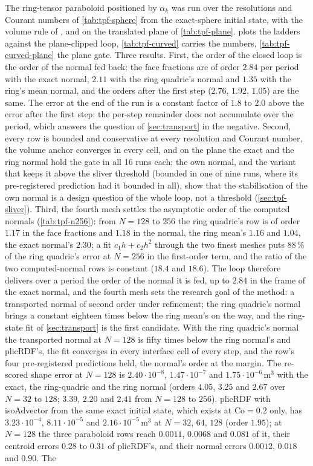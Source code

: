 \documentclass[preprint,12pt]{elsarticle}
\begin{document}
The ring-tensor paraboloid positioned by $\alpha_k$ was run over the resolutions and Courant numbers of \cref{tab:tpf-sphere} from the exact-sphere initial state, with the volume rule of \citet{KromerBothe2023Init}, and on the translated plane of \cref{tab:tpf-plane}.  plots the ladders against the plane-clipped loop, \cref{tab:tpf-curved} carries the numbers, \cref{tab:tpf-curved-plane} the plane gate. Three results. First, the order of the closed loop is the order of the normal fed back: the face fractions are of order $2.84$ per period with the exact normal, $2.11$ with the ring quadric's normal and $1.35$ with the ring's mean normal, and the orders after the first step ($2.76$, $1.92$, $1.05$) are the same. The error at the end of the run is a constant factor of $1.8$ to $2.0$ above the error after the first step: the per-step remainder does not accumulate over the period, which answers the question of \cref{sec:transport} in the negative. Second, every row is bounded and conservative at every resolution and Courant number, the volume anchor converges in every cell, and on the plane the exact and the ring normal hold the gate in all 16 runs each; the own normal, and the variant that keeps it above the sliver threshold (bounded in one of nine runs, where its pre-registered prediction had it bounded in all), show that the stabilisation of the own normal is a design question of the whole loop, not a threshold (\cref{sec:tpf-sliver}). Third, the fourth mesh settles the asymptotic order of the computed normals (\cref{tab:tpf-n256}): from $N = 128$ to $256$ the ring quadric's row is of order $1.17$ in the face fractions and $1.18$ in the normal, the ring mean's $1.16$ and $1.04$, the exact normal's $2.30$; a fit $c_1 h + c_2 h^2$ through the two finest meshes puts $88\,\%$ of the ring quadric's error at $N = 256$ in the first-order term, and the ratio of the two computed-normal rows is constant ($18.4$ and $18.6$). The loop therefore delivers over a period the order of the normal it is fed, up to $2.84$ in the frame of the exact normal, and the fourth mesh sets the research goal of the method: a transported normal of second order under refinement; the ring quadric's normal brings a constant eighteen times below the ring mean's on the way, and the ring-state fit of \cref{sec:transport} is the first candidate. With the ring quadric's normal the transported normal at $N = 128$ is fifty times below the ring normal's and plicRDF's, the fit converges in every interface cell of every step, and the row's four pre-registered predictions held, the normal's order at the margin. The re-scored shape error at $N = 128$ is $2.40\cdot10^{-8}$, $1.47\cdot10^{-7}$ and $1.75\cdot10^{-6}\,\mathrm{m^3}$ with the exact, the ring-quadric and the ring normal (orders $4.05$, $3.25$ and $2.67$ over $N = 32$ to $128$; $3.39$, $2.20$ and $2.41$ from $N = 128$ to $256$). plicRDF with isoAdvector from the same exact initial state, which exists at $\mathrm{Co} = 0.2$ only, has $3.23\cdot10^{-4}$, $8.11\cdot10^{-5}$ and $2.16\cdot10^{-5}\,\mathrm{m^3}$ at $N = 32$, $64$, $128$ (order $1.95$); at $N = 128$ the three paraboloid rows reach $0.0011$, $0.0068$ and $0.081$ of it, their centroid errors $0.28$ to $0.31$ of plicRDF's, and their normal errors $0.0012$, $0.018$ and $0.90$. The 
\end{document}

